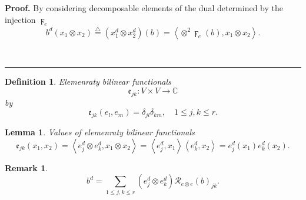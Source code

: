 \documentclass[aps,preprint]{revtex4}%
\newtheorem{definition}[theorem]{Definition}
\newtheorem{lemma}[theorem]{Lemma}
\newtheorem{remark}[theorem]{Remark}
\newenvironment{proof}[1][Proof]{\noindent\textbf{#1.} }{\ \rule{0.5em}{0.5em}}
\begin{document}
\begin{proof}
By considering decomposable elements of the dual determined by the injection
$\digamma_{e}\quad$
\begin{equation}
b^{d}\left(  x_{1}\otimes x_{2}\right)  \overset{\bigtriangleup}{=}\left(
x_{1}^{d}\otimes x_{2}^{d}\right)  \left(  b\right)  =\left\langle \otimes
^{2}\digamma_{e}\left(  b\right)  ,x_{1}\otimes x_{2}\right\rangle .
\end{equation}

\end{proof}

\begin{definition}
Elemenraty bilinear functionals
\begin{equation}
\mathfrak{e}_{jk}:V\times V\rightarrow\mathbb{C}%
\end{equation}
by%
\begin{equation}
\mathfrak{e}_{jk}\left(  e_{l},e_{m}\right)  =\delta_{jl}\delta_{km}%
,\quad1\leq j,k\leq r.
\end{equation}

\end{definition}

\begin{lemma}
Values of elemenraty bilinear functionals
\begin{equation}
\mathfrak{e}_{jk}\left(  x_{1},x_{2}\right)  =\left\langle e_{j}^{d}\otimes
e_{k}^{d},x_{1}\otimes x_{2}\right\rangle =\left\langle e_{j}^{d}%
,x_{1}\right\rangle \left\langle e_{k}^{d},x_{2}\right\rangle =e_{j}%
^{d}\left(  x_{1}\right)  e_{k}^{d}\left(  x_{2}\right)  .
\end{equation}

\end{lemma}

\begin{remark}%
\begin{equation}
b^{d}=\sum_{1\leq j,k\leq r}\left(  e_{j}^{d}\otimes e_{k}^{d}\right)
\mathcal{R}_{e\otimes e}\left(  b\right)  _{jk}.
\end{equation}

\end{remark}
\end{document}
